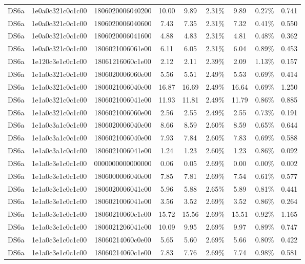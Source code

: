 \begin{tabular}{|c|c c|c|c c|c c|c|}
  DS6a & 1e0a0c321c0c1c00 & 1806020006040200 & 10.00 & 9.89 & 2.31\% & 9.89 & 0.27\% & 0.741 \\
  DS6a & 1e0a0c321c0c1c00 & 1806020006040600 & 7.43 & 7.35 & 2.31\% & 7.32 & 0.41\% & 0.550 \\
  DS6a & 1e0a0c321c0c1c00 & 1806020006041600 & 4.88 & 4.83 & 2.31\% & 4.81 & 0.48\% & 0.362 \\
  DS6a & 1e0a0c321c0c1c00 & 1806021006061e00 & 6.11 & 6.05 & 2.31\% & 6.04 & 0.89\% & 0.453 \\
  DS6a & 1e120c3e1c0c1c00 & 18061216060c1e00 & 2.12 & 2.11 & 2.39\% & 2.09 & 1.13\% & 0.157 \\
  DS6a & 1e1a0c321c0c1c00 & 1806020006060e00 & 5.56 & 5.51 & 2.49\% & 5.53 & 0.69\% & 0.414 \\
  DS6a & 1e1a0c321c0c1c00 & 1806021006040e00 & 16.87 & 16.69 & 2.49\% & 16.64 & 0.69\% & 1.250 \\
  DS6a & 1e1a0c321c0c1c00 & 1806021006041e00 & 11.93 & 11.81 & 2.49\% & 11.79 & 0.86\% & 0.885 \\
  DS6a & 1e1a0c321c0c1c00 & 1806021006060e00 & 2.56 & 2.55 & 2.49\% & 2.55 & 0.73\% & 0.191 \\
  DS6a & 1e1a0c3a1c0c1c00 & 1806020006040e00 & 8.66 & 8.59 & 2.60\% & 8.59 & 0.65\% & 0.644 \\
  DS6a & 1e1a0c3a1c0c1c00 & 1806021006040e00 & 7.93 & 7.84 & 2.60\% & 7.83 & 0.69\% & 0.588 \\
  DS6a & 1e1a0c3a1c0c1c00 & 1806021006041e00 & 1.24 & 1.23 & 2.60\% & 1.23 & 0.86\% & 0.092 \\
  DS6a & 1e1a0c3e1c0c1c00 & 0000000000000000 & 0.06 & 0.05 & 2.69\% & 0.00 & 0.00\% & 0.002 \\
  DS6a & 1e1a0c3e1c0c1c00 & 1806000006040e00 & 7.85 & 7.81 & 2.69\% & 7.54 & 0.61\% & 0.577 \\
  DS6a & 1e1a0c3e1c0c1c00 & 1806020006041e00 & 5.96 & 5.88 & 2.65\% & 5.89 & 0.81\% & 0.441 \\
  DS6a & 1e1a0c3e1c0c1c00 & 1806021006041e00 & 3.56 & 3.52 & 2.69\% & 3.52 & 0.86\% & 0.264 \\
  DS6a & 1e1a0c3e1c0c1c00 & 18060210060c1e00 & 15.72 & 15.56 & 2.69\% & 15.51 & 0.92\% & 1.165 \\
  DS6a & 1e1a0c3e1c0c1c00 & 1806021206041e00 & 10.09 & 9.95 & 2.69\% & 9.97 & 0.89\% & 0.747 \\
  DS6a & 1e1a0c3e1c0c1c00 & 18060214060c0e00 & 5.65 & 5.60 & 2.69\% & 5.66 & 0.80\% & 0.422 \\
  DS6a & 1e1a0c3e1c0c1c00 & 18060214060c1e00 & 7.83 & 7.76 & 2.69\% & 7.74 & 0.98\% & 0.581 \\

\end{tabular}
